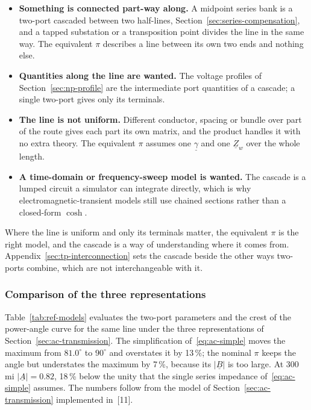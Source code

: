 \begin{itemize}
  \setlength{\itemsep}{0.35em}
  \item \textbf{Something is connected part-way along.} A midpoint series
        bank is a two-port cascaded between two half-lines,
        Section~\ref{sec:series-compensation}, and a tapped substation or a
        transposition point divides the line in the same way. The
        equivalent $\pi$ describes a line between its own two ends and
        nothing else.
  \item \textbf{Quantities along the line are wanted.} The voltage profiles
        of Section~\ref{sec:np-profile} are the intermediate port
        quantities of a cascade; a single two-port gives only its terminals.
  \item \textbf{The line is not uniform.} Different conductor, spacing or
        bundle over part of the route gives each part its own matrix, and
        the product handles it with no extra theory. The equivalent $\pi$
        assumes one $\underline{\gamma}$ and one $\underline{Z}_w$ over the
        whole length.
  \item \textbf{A time-domain or frequency-sweep model is wanted.} The
        cascade is a lumped circuit a simulator can integrate directly,
        which is why electromagnetic-transient models still use chained
        sections rather than a closed-form $\cosh$.
\end{itemize}

Where the line is uniform and only its terminals matter, the equivalent
$\pi$ is the right model, and the cascade is a way of understanding where it
comes from. Appendix~\ref{sec:tp-interconnection} sets the cascade beside
the other ways two-ports combine, which are not interchangeable with it.

\subsubsection{Comparison of the three representations}
\label{sec:ref-models}

Table~\ref{tab:ref-models} evaluates the two-port parameters and the crest
of the power-angle curve for the same line under the three representations
of Section~\ref{sec:ac-transmission}. The simplification
of~\eqref{eq:ac-simple} moves the maximum from $81.0^\circ$ to $90^\circ$
and overstates it by 13\,\%; the nominal $\pi$ keeps the angle but
understates the maximum by 7\,\%, because its $\left|\underline{B}\right|$
is too large. At 300\,mi $\left|\underline{A}\right| = 0.82$, 18\,\% below
the unity that the single series impedance of~\eqref{eq:ac-simple} assumes.
The numbers follow from the model of
Section~\ref{sec:ac-transmission} implemented in~[11].

